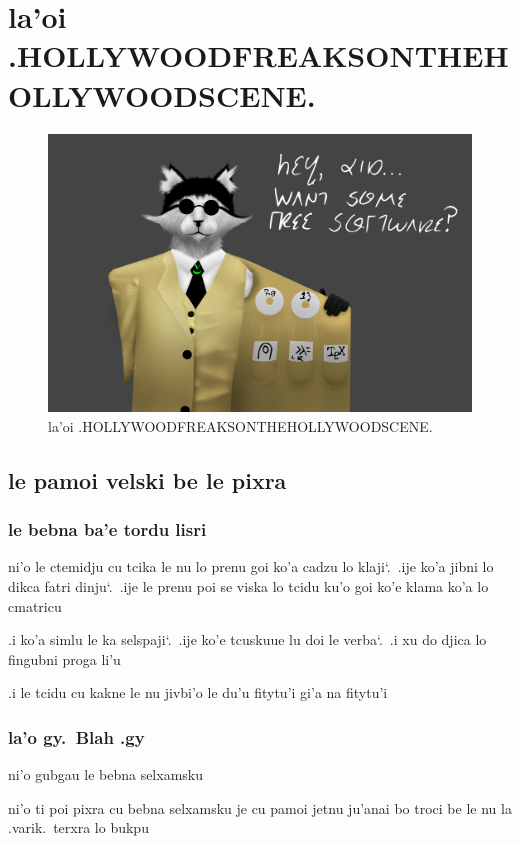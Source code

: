 \documentclass{report}
\newcommand\sds{\spacefactor\sfcode`.\ \space}
\begin{document}
\chapter{la'oi .HOLLYWOODFREAKSONTHEHOLLYWOODSCENE.}
\begin{figure}[ht]
	\centering
	\includegraphics[keepaspectratio, width=\textwidth, height=0.75\textheight]{hollywoodfreaksonthehollywoodscene/hollywoodfreaksonthehollywoodscene.png}
	\caption[center]{la'oi .HOLLYWOODFREAKSONTHEHOLLYWOODSCENE.}
\end{figure}
\section{le pamoi velski be le pixra}
\subsection{le bebna ba'e tordu lisri}
ni'o le ctemidju cu tcika le nu lo prenu goi ko'a cadzu lo klaji\sds  .ije ko'a jibni lo dikca fatri dinju\sds  .ije le prenu poi se viska lo tcidu ku'o goi ko'e klama ko'a lo cmatricu

.i ko'a simlu le ka selspaji\sds  .ije ko'e tcuskuue lu doi le verba\sds  .i xu do djica lo fingubni proga li'u

.i le tcidu cu kakne le nu jivbi'o le du'u fitytu'i gi'a na fitytu'i

\subsection{la'o gy.\ Blah .gy}
ni'o gubgau le bebna selxamsku

ni'o ti poi pixra cu bebna selxamsku je cu pamoi jetnu ju'anai bo troci be le nu la .varik.\ terxra lo bukpu
\end{document}
